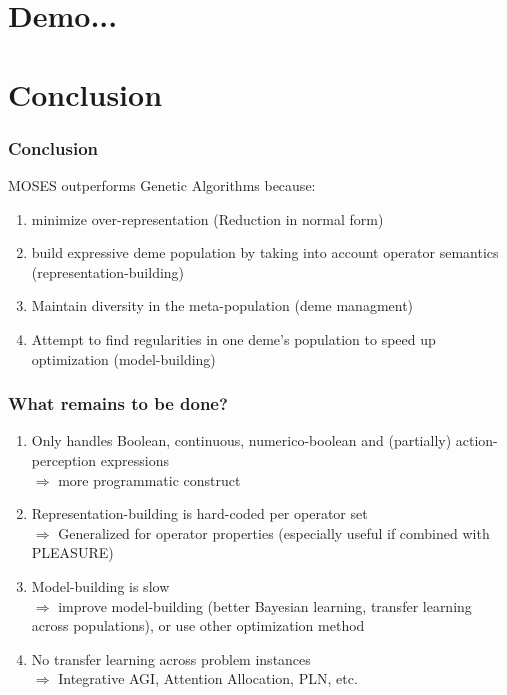 \documentclass{beamer}
\begin{document}
\section{Demo...}

\section{Conclusion}

\frame
{
  \frametitle{Conclusion}

  MOSES outperforms Genetic Algorithms because:
   \begin{enumerate}
   \item<+-> minimize over-representation (\alert{Reduction in normal form})
   \item<+-> build expressive deme population by taking into account
     operator semantics (\alert{representation-building})
   \item<+-> Maintain diversity in the meta-population (\alert{deme managment})
   \item<+-> Attempt to find regularities in one deme's population to
     speed up optimization (\alert{model-building})
   \end{enumerate}
}

\frame
{
  \frametitle{What remains to be done?}

  \begin{enumerate}
  \item<+-> Only handles Boolean, continuous, numerico-boolean and
    (partially) action-perception expressions\\
    $\Rightarrow$ \alert{more programmatic construct}
  \item<+-> Representation-building is hard-coded per operator set\\
    $\Rightarrow$ Generalized for \alert{operator properties
      (especially useful if combined with PLEASURE)}
  \item<+-> Model-building is slow\\
    $\Rightarrow$ \alert{improve model-building} (better Bayesian learning,
    transfer learning across populations), or use other optimization method
  \item<+-> No transfer learning across problem instances\\
    $\Rightarrow$ Integrative AGI, Attention Allocation, PLN, etc.
  \end{enumerate}
}
\end{document}
